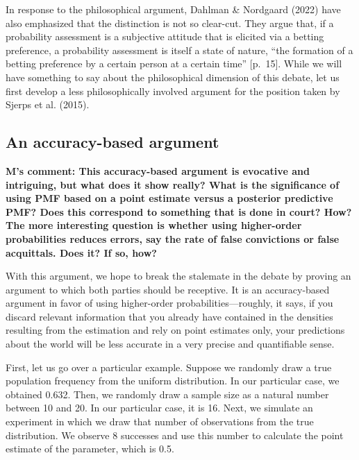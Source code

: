 \documentclass[
  10pt,
  dvipsnames,enabledeprecatedfontcommands]{scrartcl}
\begin{document}
In response to the philosophical argument, Dahlman \& Nordgaard (2022)
have also emphasized that the distinction is not so clear-cut. They
argue that, if a probability assessment is a subjective attitude that is
elicited via a betting preference, a probability assessment is itself a
state of nature, ``the formation of a betting preference by a certain
person at a certain time'' {[}p.~15{]}. While we will have something to
say about the philosophical dimension of this debate, let us first
develop a less philosophically involved argument for the position taken
by Sjerps et al. (2015).

\hypertarget{an-accuracy-based-argument}{%
\subsection{An accuracy-based
argument}\label{an-accuracy-based-argument}}


\textbf{M's comment: This accuracy-based argument is evocative and intriguing, but what does it show really? What is the significance of using PMF based on a point estimate versus a posterior predictive PMF? Does this correspond to something that is done in court? How? The more interesting question is whether using higher-order probabilities reduces errors, say the rate of false convictions or false acquittals. Does it? If so, how?}

With this argument, we hope to break the stalemate in the debate by
proving an argument to which both parties should be receptive. It is an
accuracy-based argument in favor of using higher-order
probabilities---roughly, it says, if you discard relevant information
that you already have contained in the densities resulting from the
estimation and rely on point estimates only, your predictions about the
world will be less accurate in a very precise and quantifiable sense.

First, let us go over a particular example. Suppose we randomly draw a
true population frequency from the uniform distribution. In our
particular case, we obtained 0.632. Then, we randomly draw a sample size
as a natural number between 10 and 20. In our particular case, it is 16.
Next, we simulate an experiment in which we draw that number of
observations from the true distribution. We observe 8 successes and use
this number to calculate the point estimate of the parameter, which is
0.5.
\end{document}
